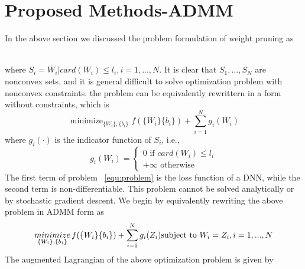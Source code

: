 \documentclass{acmtog} %
\begin{document}
\section{Proposed Methods-ADMM}
\label{sec:proposed_methods}
In the above section we discussed the problem formulation of weight pruning as
\begin{figure}[h]
\end{figure}\\
where $S_i = {W_i | card(W_i) \leq l_i}, i = 1,...,N$. It is clear that $S_1, ..., S_N$ are nonconvex sets, and it is general difficult to solve optimization problem with nonconvex constraints. the problem can be equivalently rewrittern in a form without constraints, which is \\
\begin{equation}\label{equ:problem}
\mathop {minimize}_{\{W_i\},\{b_i\}} f(\{W_i\}\{b_i\}) + \sum_{i=1}^Ng_i(W_i)
\end{equation}
where $g_i(·)$ is the indicator function of $S_i$, i.e.,\\
\begin{equation*}
  g_i(W_i) = \begin{cases}
    0\mbox{ if }card(W_i)\leq l_i\\
    +\infty\mbox{ otherwise}
  \end{cases}
\end{equation*}
The first term of problem ~\ref{equ:problem} is the loss function of a DNN, while the second term is non-differentiable. This problem cannot be solved analytically or by stochastic gradient descent. We begin by equivalently rewriting the above problem in ADMM form as
\begin{equation*}\label{equ:problem_rewrite}
  \mathop {minimize}_{\{W_i\},\{b_i\}} f(\{W_i\}\{b_i\}) + \sum_{i=1}^Ng_i(Z_i)\\
  \mbox{subject to }W_i = Z_i, i = 1, ..., N
\end{equation*}
The augmented Lagrangian of the above optimization problem is given by
\begin{figure}[h]
\end{figure}\\
\end{document}
